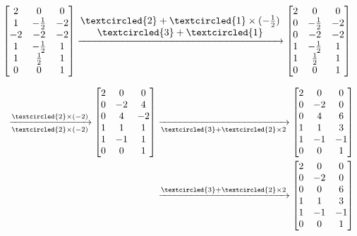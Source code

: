 \documentclass[compress,mathserif,cjk]{beamer}
\theoremstyle{remark}
\numberwithin{equation}{section}
\begin{document}
\begin{CJK}{UTF8}{gbsn}
\begin{frame}
\begin{eqnarray*}
\left[\begin{matrix}2&0&0\\1&-\frac{1}2&-2\\-2&-2&-2\\1&-\frac{1}2&1\\1&\frac{1}2&1\\0&0&1\end{matrix}\right]
\xrightarrow{\begin{matrix}\textcircled{\scriptsize 2}+\textcircled{\scriptsize 1}\times(-\frac{1}2)\\\textcircled{\scriptsize 3}+\textcircled{\scriptsize 1}\end{matrix}}
\left[\begin{matrix}2&0&0\\0&-\frac{1}2&-2\\0&-2&-2\\1&-\frac{1}2&1\\1&\frac{1}2&1\\0&0&1\end{matrix}\right]
\end{eqnarray*}
\end{frame}

\begin{frame}
\begin{eqnarray*}
&&\xrightarrow[\textcircled{\scriptsize 2}\times(-2)]{\textcircled{\scriptsize 2}\times(-2)}
\left[\begin{matrix}2&0&0\\0&-2&4\\0&4&-2\\1&1&1\\1&-1&1\\0&0&1\end{matrix}\right]
\xrightarrow[\textcircled{\scriptsize 3}+\textcircled{\scriptsize 2}\times2]{}\left[\begin{matrix}2&0&0\\0&-2&0\\0&4&6\\1&1&3\\1&-1&-1\\0&0&1\end{matrix}\right]\\
&&\xrightarrow{\textcircled{\scriptsize 3}+\textcircled{\scriptsize 2}\times2}\left[\begin{matrix}2&0&0\\0&-2&0\\0&0&6\\1&1&3\\1&-1&-1\\0&0&1\end{matrix}\right]
\end{eqnarray*}
\end{frame}


\end{CJK}
\end{document}
